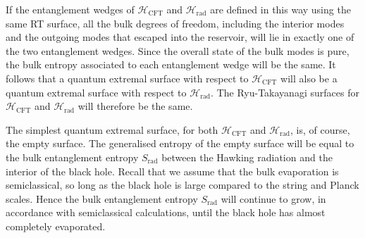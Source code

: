 \documentclass[11pt,a4paper]{article}
\newcommand{\Srad}{S_\text{rad} }
\begin{document}
If the entanglement wedges of $\mathcal{H}_\text{CFT}$ and $\mathcal{H}_\text{rad}$ are defined in this way using the same RT surface, all the bulk degrees of freedom, including the interior modes and the outgoing modes that escaped into the reservoir, will lie in exactly one of the two entanglement wedges. Since the overall state of the bulk modes is pure, the bulk entropy associated to each entanglement wedge will be the same. It follows that a quantum extremal surface with respect to $\mathcal{H}_\text{CFT}$ will also be a quantum extremal surface with respect to $\mathcal{H}_\text{rad}$. The Ryu-Takayanagi surfaces for $\mathcal{H}_\text{CFT}$ and $\mathcal{H}_\text{rad}$ will therefore be the same.

The simplest quantum extremal surface, for both $\mathcal{H}_\text{CFT}$ and $\mathcal{H}_\text{rad}$, is, of course, the empty surface. The generalised entropy of the empty surface will be equal to the bulk entanglement entropy $\Srad$ between the Hawking radiation and the interior of the black hole. Recall that we assume that the bulk evaporation is semiclassical, so long as the black hole is large compared to the string and Planck scales. Hence the bulk entanglement entropy $\Srad$ will continue to grow, in accordance with semiclassical calculations,  until the black hole has almost completely evaporated.
\end{document}
